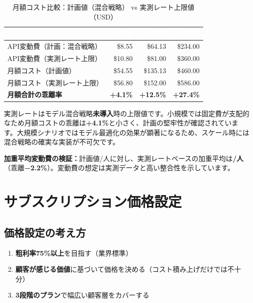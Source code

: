 \documentclass[a4paper,11pt]{ltjsarticle}
\begin{document}
\begin{table}[H]
\centering
\caption{月額コスト比較：計画値（混合戦略） vs 実測レート上限値（USD）}
\begin{tabular}{lrrr}
\toprule
\rowcolor{headerblue}\textcolor{white}{\textbf{}} & \textcolor{white}{\textbf{小規模}} & \textcolor{white}{\textbf{中規模}} & \textcolor{white}{\textbf{大規模}} \\
\midrule
API変動費（計画：混合戦略） & \$8.55 & \$64.13 & \$234.00 \\
\rowcolor{lightgray}
API変動費（実測レート上限） & \$10.80 & \$81.00 & \$360.00 \\
月額コスト（計画値） & \$54.55 & \$135.13 & \$460.00 \\
\rowcolor{lightgray}
月額コスト（実測レート上限） & \$56.80 & \$152.00 & \$586.00 \\
\textbf{月額合計の乖離率} & \textbf{+4.1\%} & \textbf{+12.5\%} & \textbf{+27.4\%} \\
\bottomrule
\end{tabular}
\end{table}

\begin{infobox}[乖離分析の解釈]
実測レートはモデル混合戦略\textbf{未導入}時の上限値です。小規模では固定費が支配的なため月額コストの乖離は\textbf{+4.1\%}と小さく、計画の堅牢性が確認されています。大規模シナリオではモデル最適化の効果が顕著になるため、スケール時には混合戦略の確実な実装が不可欠です。

\textbf{加重平均変動費の検証：}計画値/人に対し、実測レートベースの加重平均は\textbf{/人}（乖離\textbf{−2.2\%}）。変動費の想定は実測データと高い整合性を示しています。
\end{infobox}


\section{サブスクリプション価格設定}

\subsection{価格設定の考え方}

\begin{infobox}[SaaSの価格設定3原則]
\begin{enumerate}
  \item \textbf{粗利率75\%以上}を目指す（業界標準）
  \item \textbf{顧客が感じる価値}に基づいて価格を決める（コスト積み上げだけでは不十分）
  \item \textbf{3段階のプラン}で幅広い顧客層をカバーする
\end{enumerate}
\end{infobox}
\end{document}

